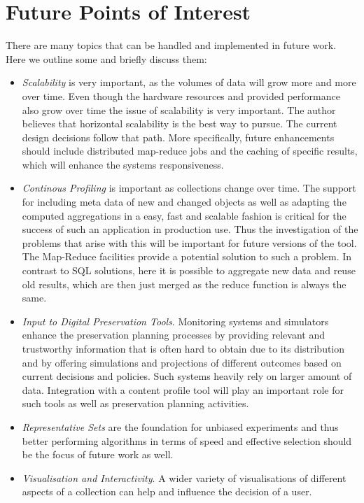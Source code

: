 \section{Future Points of Interest}
There are many topics that can be handled and implemented in future work. Here we outline some and briefly discuss them:
\begin {itemize}
\item \textit{Scalability} is very important, as the volumes of data will grow more and more over time. Even though the hardware resources and provided performance also grow over time the issue of scalability is very important. The author believes that horizontal scalability is the best way to pursue. The current design decisions follow that path. More specifically, future enhancements should include distributed map-reduce jobs and the caching of specific results, which will enhance the systems responsiveness.

\item \textit{Continous Profiling} is important as collections change over time. The support for including meta data of new and changed objects as well as adapting the computed aggregations in a easy, fast and scalable fashion is critical for the success of such an application in production use. Thus the investigation of the problems that arise with this will be important for future versions of the tool. The Map-Reduce facilities provide a potential solution to such a problem. In contrast to SQL solutions, here it is possible to aggregate new data and reuse old results, which are then just merged as the reduce function is always the same.

\item \textit{Input to Digital Preservation Tools}. Monitoring systems and simulators enhance the preservation planning processes by providing relevant and trustworthy information that is often hard to obtain due to its distribution and by offering simulations and projections of different outcomes based on current decisions and policies. Such systems heavily rely on larger amount of data. Integration with a content profile tool will play an important role for such tools as well as preservation planning activities.

\item \textit{Representative Sets} are the foundation for unbiased experiments and thus better performing algorithms in terms of speed and effective selection should be the focus of future work as well. 

\item \textit{Visualisation and Interactivity}. A wider variety of visualisations of different aspects of a collection can help and influence the decision of a user.
\end{itemize}

